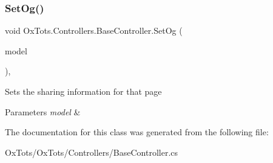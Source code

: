 \subsubsection{\texorpdfstring{SetOg()}{SetOg()}}
{\footnotesize\ttfamily void Ox\+Tots.\+Controllers.\+Base\+Controller.\+Set\+Og (\begin{DoxyParamCaption}\item[{Og\+View\+Model}]{model }\end{DoxyParamCaption})\hspace{0.3cm}{\ttfamily [inline]}, {\ttfamily [protected]}}



Sets the sharing information for that page 


\begin{DoxyParams}{Parameters}
{\em model} & \\
\hline
\end{DoxyParams}


The documentation for this class was generated from the following file\+:\begin{DoxyCompactItemize}
\item 
Ox\+Tots/\+Ox\+Tots/\+Controllers/Base\+Controller.\+cs\end{DoxyCompactItemize}
